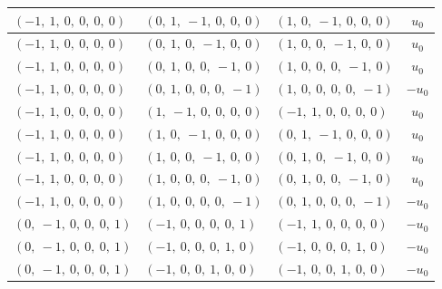 \documentclass[11pt]{article}
\theoremstyle{definition}
\begin{document}
\begin{longtable}{|l|l|l|c|}
    \hline
    $\left( -1, \  1, \  0, \  0, \  0, \  0\right)$ & $\left( 0, \  1, \  -1, \  0, \  0, \  0\right)$ & $\left( 1, \  0, \  -1, \  0, \  0, \  0\right)$ & $u_{0}$ \\
    \hline
    $\left( -1, \  1, \  0, \  0, \  0, \  0\right)$ & $\left( 0, \  1, \  0, \  -1, \  0, \  0\right)$ & $\left( 1, \  0, \  0, \  -1, \  0, \  0\right)$ & $u_{0}$ \\
    \hline
    $\left( -1, \  1, \  0, \  0, \  0, \  0\right)$ & $\left( 0, \  1, \  0, \  0, \  -1, \  0\right)$ & $\left( 1, \  0, \  0, \  0, \  -1, \  0\right)$ & $u_{0}$ \\
    \hline
    $\left( -1, \  1, \  0, \  0, \  0, \  0\right)$ & $\left( 0, \  1, \  0, \  0, \  0, \  -1\right)$ & $\left( 1, \  0, \  0, \  0, \  0, \  -1\right)$ & $- u_{0}$ \\
    \hline
    $\left( -1, \  1, \  0, \  0, \  0, \  0\right)$ & $\left( 1, \  -1, \  0, \  0, \  0, \  0\right)$ & $\left( -1, \  1, \  0, \  0, \  0, \  0\right)$ & $u_{0}$ \\
    \hline
    $\left( -1, \  1, \  0, \  0, \  0, \  0\right)$ & $\left( 1, \  0, \  -1, \  0, \  0, \  0\right)$ & $\left( 0, \  1, \  -1, \  0, \  0, \  0\right)$ & $u_{0}$ \\
    \hline
    $\left( -1, \  1, \  0, \  0, \  0, \  0\right)$ & $\left( 1, \  0, \  0, \  -1, \  0, \  0\right)$ & $\left( 0, \  1, \  0, \  -1, \  0, \  0\right)$ & $u_{0}$ \\
    \hline
    $\left( -1, \  1, \  0, \  0, \  0, \  0\right)$ & $\left( 1, \  0, \  0, \  0, \  -1, \  0\right)$ & $\left( 0, \  1, \  0, \  0, \  -1, \  0\right)$ & $u_{0}$ \\
    \hline
    $\left( -1, \  1, \  0, \  0, \  0, \  0\right)$ & $\left( 1, \  0, \  0, \  0, \  0, \  -1\right)$ & $\left( 0, \  1, \  0, \  0, \  0, \  -1\right)$ & $- u_{0}$ \\
    \hline
    $\left( 0, \  -1, \  0, \  0, \  0, \  1\right)$ & $\left( -1, \  0, \  0, \  0, \  0, \  1\right)$ & $\left( -1, \  1, \  0, \  0, \  0, \  0\right)$ & $- u_{0}$ \\
    \hline
    $\left( 0, \  -1, \  0, \  0, \  0, \  1\right)$ & $\left( -1, \  0, \  0, \  0, \  1, \  0\right)$ & $\left( -1, \  0, \  0, \  0, \  1, \  0\right)$ & $- u_{0}$ \\
    \hline
    $\left( 0, \  -1, \  0, \  0, \  0, \  1\right)$ & $\left( -1, \  0, \  0, \  1, \  0, \  0\right)$ & $\left( -1, \  0, \  0, \  1, \  0, \  0\right)$ & $- u_{0}$ \\

\end{longtable}
\end{document}
